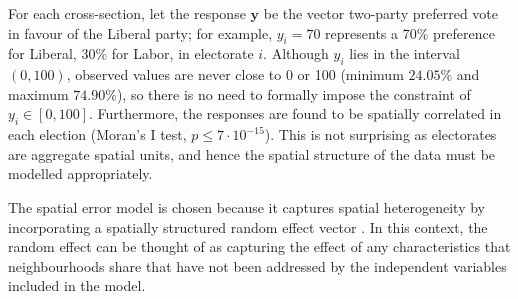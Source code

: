 \documentclass[
  times, doublespace]{anzsauth}
\begin{document}
For each cross-section, let the response \(\bm{y}\) be the vector two-party preferred vote in favour of the Liberal party; for example, \(y_i = 70\) represents a 70\% preference for Liberal, 30\% for Labor, in electorate \(i\). Although \(y_i\) lies in the interval \((0,100)\), observed values are never close to 0 or 100 (minimum \(24.05 \%\) and maximum \(74.90 \%\)), so there is no need to formally impose the constraint of \(y_i \in [0,100]\). Furthermore, the responses are found to be spatially correlated in each election (Moran's I test, \(p \le 7\cdot10^{-15}\)). This is not surprising as electorates are aggregate spatial units, and hence the spatial structure of the data must be modelled appropriately.

The spatial error model \citep{Anselin88} is chosen because it captures spatial heterogeneity by incorporating a spatially structured random effect vector \citep{LeSage2009}. In this context, the random effect can be thought of as capturing the effect of any characteristics that neighbourhoods share that have not been addressed by the independent variables included in the model.
\end{document}
